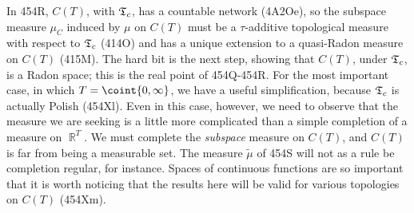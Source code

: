 {In 454R, $C(T)$, with $\frak T_c$, has a
countable network (4A2Oe), so the subspace measure $\mu_C$
induced by $\mu$ on $C(T)$ must be a $\tau$-additive topological measure
with respect to $\frak T_c$ (414O) and has a unique extension to a
quasi-Radon
measure on $C(T)$ (415M).   The hard bit is the next step, showing that
$C(T)$, under $\frak T_c$, is a Radon space;  this is the real point of
454Q-454R.   For the most important case, in which $T=\coint{0,\infty}$,
we have a useful simplification, because $\frak T_c$ is actually Polish
(454Xl).   Even in this case, however, we need to observe that the
measure we are seeking is a little more complicated than a simple
completion of a measure on $\BbbR^T$.
We must complete the {\it subspace} measure on $C(T)$, and $C(T)$ is far
from being a measurable set.   The measure $\tilde\mu$ of 454S will not
as a rule be completion regular, for instance.   Spaces of continuous
functions are so important that it is worth noticing that the results
here will be valid for various topologies on $C(T)$ (454Xm).

}%

\discrpage

